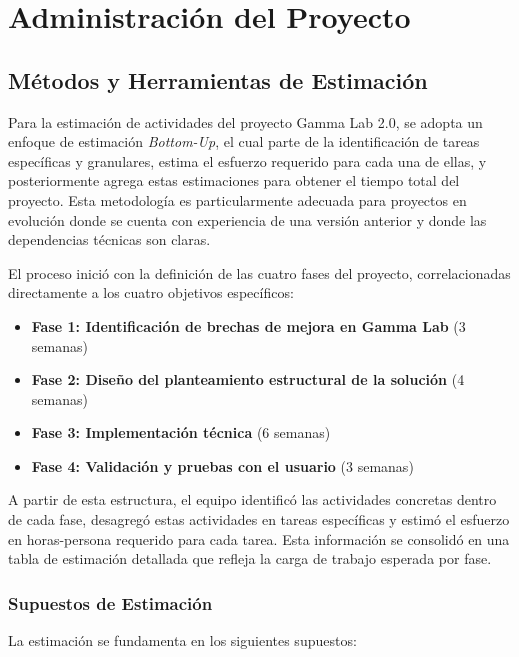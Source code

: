 \documentclass{article}
\begin{document}
\section{Administración del Proyecto}

\subsection{Métodos y Herramientas de Estimación}

Para la estimación de actividades del proyecto Gamma Lab 2.0, se adopta un enfoque de estimación \textit{Bottom-Up}, el cual parte de la identificación de tareas específicas y granulares, estima el esfuerzo requerido para cada una de ellas, y posteriormente agrega estas estimaciones para obtener el tiempo total del proyecto. Esta metodología es particularmente adecuada para proyectos en evolución donde se cuenta con experiencia de una versión anterior y donde las dependencias técnicas son claras.

El proceso inició con la definición de las cuatro fases del proyecto, correlacionadas directamente a los cuatro objetivos específicos:

\begin{itemize}
    \item \textbf{Fase 1: Identificación de brechas de mejora en Gamma Lab} (3 semanas)
    \item \textbf{Fase 2: Diseño del planteamiento estructural de la solución} (4 semanas)
    \item \textbf{Fase 3: Implementación técnica} (6 semanas)
    \item \textbf{Fase 4: Validación y pruebas con el usuario} (3 semanas)
\end{itemize}

A partir de esta estructura, el equipo identificó las actividades concretas dentro de cada fase, desagregó estas actividades en tareas específicas y estimó el esfuerzo en horas-persona requerido para cada tarea. Esta información se consolidó en una tabla de estimación detallada que refleja la carga de trabajo esperada por fase.

\subsubsection{Supuestos de Estimación}

La estimación se fundamenta en los siguientes supuestos:
\end{document}
